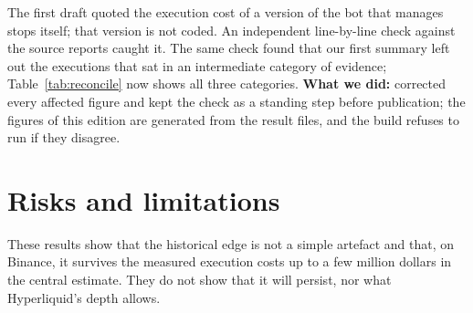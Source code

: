 \documentclass[11pt,a4paper]{article}
\begin{document}
\begin{keybox}
The first draft quoted the execution cost of a version of the bot that manages stops itself; that version is not coded. An
independent line-by-line check against the source reports caught it. The same check found that our first summary left out the
executions that sat in an intermediate category of evidence; Table~\ref{tab:reconcile} now shows all three categories.
\textbf{What we did:} corrected every affected figure and kept the check as a standing step before publication; the figures of
this edition are generated from the result files, and the build refuses to run if they disagree.
\end{keybox}

\section{Risks and limitations}\label{sec:risks}
These results show that the historical edge is not a simple artefact and that, on Binance, it survives the measured execution
costs up to a few million dollars in the central estimate. They do not show that it will persist, nor what Hyperliquid's depth
allows.
\end{document}
